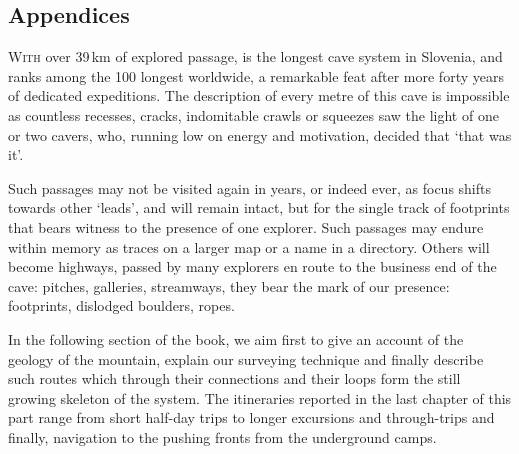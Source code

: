 \begin{tcolorbox}
	\vspace{60pt}
	\part{Appendices}
	\lettrine{W}{ith} over 39\,km of explored passage,  is the longest cave system in Slovenia, and ranks among the 100 longest worldwide, a remarkable feat after more forty years of dedicated expeditions. The description of every metre of this cave is impossible as countless recesses, cracks, indomitable crawls or squeezes saw the light of one or two cavers, who, running low on energy and motivation, decided that `that was it'. 

	Such passages may not be visited again in years, or indeed ever, as focus shifts towards other `leads', and will remain intact, but for the single track of footprints that bears witness to the presence of one explorer. Such passages may endure within memory as traces on a larger map or a name in a directory. Others will become highways, passed by many explorers en route to the business end of the cave: pitches, galleries, streamways, they bear the mark of our presence: footprints, dislodged boulders, ropes. 
	
	\mydelimiter

	In the following section of the book, we aim first to give an account of the geology of the mountain, explain our surveying technique and finally describe such routes which through their connections and their loops form the still growing skeleton of the system. The itineraries reported in the last chapter of this part range from short half-day trips  to longer excursions and through-trips and finally, navigation to the pushing fronts from the underground camps.
\end{tcolorbox}

